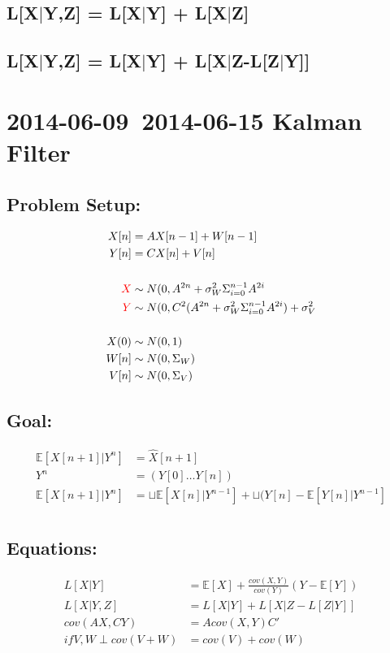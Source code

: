 \documentclass[leqno,twocolumn]{article}
\begin{document}
\subsection{L[X$|$Y,Z] = L[X$|$Y] + L[X$|$Z]}

\subsection{L[X$|$Y,Z] = L[X$|$Y] + L[X$|$Z-L[Z$|$Y]]}

\section{2014-06-09~2014-06-15 Kalman Filter}
\subsection{Problem Setup:}
\begin{align*}
X[n] &= AX[n-1]+W[n-1]\\
Y[n] &= CX[n]+V[n]\\
\\
\textcolor{red}{X} &\sim N(0, A^{2n} + \sigma_W^2\Sigma_{i=0}^{n-1}A^{2i}\\
\textcolor{red}{Y} &\sim N(0, C^2(A^{2n} + \sigma_W^2\Sigma_{i=0}^{n-1}A^{2i}) + \sigma_V^2\\
\\
X(0) &\sim N(0,1)\\
W[n] &\sim N(0,\Sigma_W)\\
V[n] &\sim N(0,\Sigma_V)
\end{align*}

\subsection{Goal:}
\begin{align*}
\mathbb{E}[X[n+1]|Y^n] &= \hat{X}[n+1]\\
Y^n &= (Y[0] \dots Y[n])\\
\mathbb{E}[X[n+1]|Y^n] &= \sqcup\mathbb{E}[X[n]|Y^{n-1}] + \sqcup(Y[n] - \mathbb{E}[Y[n]|Y^{n-1}]  \\
\end{align*}

\subsection{Equations:}
\begin{align}
L[X|Y] &= \mathbb{E}[X] + \frac{cov(X,Y)}{cov(Y)}(Y-\mathbb{E}[Y])\\
L[X|Y,Z] &= L[X|Y] + L[X|Z-L[Z|Y]]\\
cov(AX,CY) &= Acov(X,Y)C'\\
if V,W \perp cov(V+W) &= cov(V) + cov(W)
\end{align}
\end{document}
